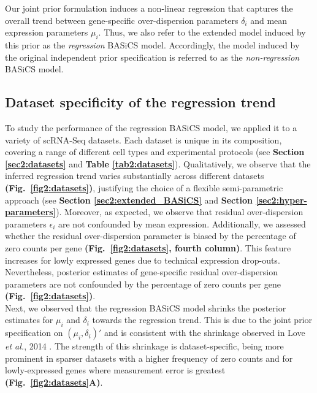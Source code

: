 Our joint prior formulation induces a non-linear regression that captures the overall trend between gene-specific over-dispersion parameters $\delta_i$ and mean expression parameters $\mu_i$. Thus, we also refer to the extended model induced by this prior as the \textit{regression} BASiCS model. Accordingly, the model induced by the original independent prior specification \citep{Vallejos2016} is referred to as the \textit{non-regression} BASiCS model. 

\subsection{Dataset specificity of the regression trend}

To study the performance of the regression BASiCS model, we applied it to a variety of scRNA-Seq datasets. Each dataset is unique in its composition, covering a range of different cell types and experimental protocols (see \textbf{Section \ref{sec2:datasets}} and \textbf{Table \ref{tab2:datasets}}). Qualitatively, we observe that the inferred regression trend varies substantially across different datasets \textbf{(Fig.~\ref{fig2:datasets})}, justifying the choice of a flexible semi-parametric approach (see \textbf{Section \ref{sec2:extended_BASiCS}} and \textbf{Section \ref{sec2:hyper-parameters}}). Moreover, as expected, we observe that residual over-dispersion parameters $\epsilon_i$ are not confounded by mean expression. Additionally, we assessed whether the residual over-dispersion parameter is biased by the percentage of zero counts per gene \textbf{(Fig.~\ref{fig2:datasets}, fourth column)}. This feature increases for lowly expressed genes due to technical expression drop-outs. Nevertheless, posterior estimates of gene-specific residual over-dispersion parameters are not confounded by the percentage of zero counts per gene \textbf{(Fig.~\ref{fig2:datasets})}. \\

Next, we observed that the regression BASiCS model shrinks the posterior estimates for $\mu_i$ and $\delta_i$ towards the regression trend. This is due to the joint prior specification on $(\mu_i,\delta_i)'$ and is consistent with the shrinkage observed in Love \emph{et al.}, 2014 \citep{Love2014}. The strength of this shrinkage is dataset-specific, being more prominent in sparser datasets with a higher frequency of zero counts and for lowly-expressed genes where measurement error is greatest \textbf{(Fig.~\ref{fig2:datasets}A)}. 

